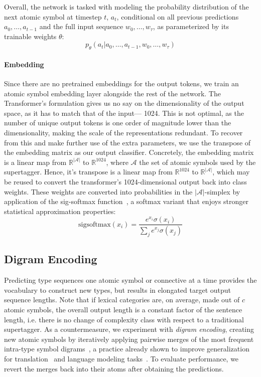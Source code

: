 Overall, the network is tasked with modeling the probability distribution of the next atomic symbol at timestep $t$, $a_t$, conditional on all previous predictions $a_0,\dots,a_{t-1}$ and the full input sequence $w_0,\dots,w_\tau$, as parameterized by its trainable weights $\theta$:
\[
p_\theta(a_t|a_0,\dots,a_{t-1},w_0,\dots,w_\tau)
\]


\paragraph{Embedding} Since there are no pretrained embeddings for the output tokens, we train an atomic symbol embedding layer alongside the rest of the network.
The Transformer's formulation gives us no say on the dimensionality of the output space, as it has to match that of the input--- 1024.
This is not optimal, as the number of unique output tokens is one order of magnitude lower than the dimensionality, making the scale of the representations redundant.
To recover from this and make further use of the extra parameters, we use the transpose of the embedding matrix as our output classifier. 
Concretely, the embedding matrix is a linear map from $\mathbb{R}^{|\mathcal{A}|}$ to $\mathbb{R}^{1024}$, where $\mathcal{A}$ the set of atomic symbols used by the supertagger.
Hence, it's transpose is a linear map from $\mathbb{R}^{1024}$ to $\mathbb{R}^{|\mathcal{A}|}$, which may be reused to convert the transformer's 1024-dimensional output back into class weights.
These weights are converted into probabilities in the $|\mathcal{A}|$-simplex by application of the sig-softmax function~\cite{kanai2018sigsoftmax}, a softmax variant that enjoys stronger statistical approximation properties:
\[
\text{sigsoftmax}(x_i) = \frac{e^{x_i}\sigma(x_i)}{\sum_j{e^{x_j}\sigma(x_j)}}
\]

\subsection{Digram Encoding}
Predicting type sequences one atomic symbol or connective at a time provides the vocabulary to construct new types, but results in elongated target output sequence lengths. Note that if lexical categories are, on average, made out of $c$ atomic symbols, the overall output length is a constant factor of the sentence length, i.e. there is no change of complexity class with respect to a traditional supertagger.
As a countermeasure, we experiment with {\it digram encoding}, creating new atomic symbols by iteratively applying pairwise merges of  the most frequent intra-type symbol digrams~\cite{bpe}, a practice already shown to improve generalization for translation~\cite{bpe2} and language modeling tasks~\cite{gpt}. 
To evaluate performance, we revert the merges back into their atoms after obtaining the predictions.


